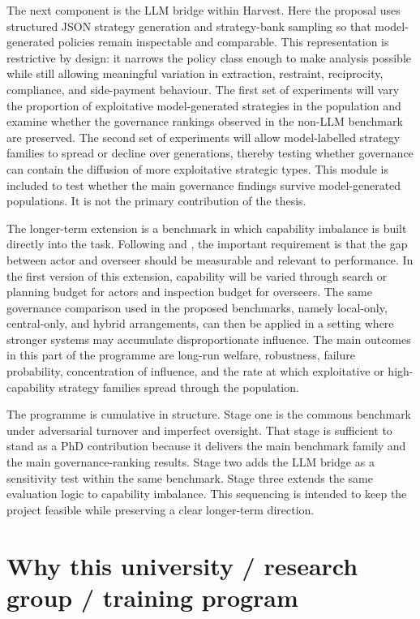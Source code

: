 \documentclass[10pt]{article}
\begin{document}
The next component is the LLM bridge within Harvest. Here the proposal uses structured JSON strategy generation and strategy-bank sampling so that model-generated policies remain inspectable and comparable. This representation is restrictive by design: it narrows the policy class enough to make analysis possible while still allowing meaningful variation in extraction, restraint, reciprocity, compliance, and side-payment behaviour. The first set of experiments will vary the proportion of exploitative model-generated strategies in the population and examine whether the governance rankings observed in the non-LLM benchmark are preserved. The second set of experiments will allow model-labelled strategy families to spread or decline over generations, thereby testing whether governance can contain the diffusion of more exploitative strategic types. This module is included to test whether the main governance findings survive model-generated populations. It is not the primary contribution of the thesis.

The longer-term extension is a benchmark in which capability imbalance is built directly into the task. Following \citet{bowman2022} and \citet{engels2025}, the important requirement is that the gap between actor and overseer should be measurable and relevant to performance. In the first version of this extension, capability will be varied through search or planning budget for actors and inspection budget for overseers. The same governance comparison used in the proposed benchmarks, namely local-only, central-only, and hybrid arrangements, can then be applied in a setting where stronger systems may accumulate disproportionate influence. The main outcomes in this part of the programme are long-run welfare, robustness, failure probability, concentration of influence, and the rate at which exploitative or high-capability strategy families spread through the population.

The programme is cumulative in structure. Stage one is the commons benchmark under adversarial turnover and imperfect oversight. That stage is sufficient to stand as a PhD contribution because it delivers the main benchmark family and the main governance-ranking results. Stage two adds the LLM bridge as a sensitivity test within the same benchmark. Stage three extends the same evaluation logic to capability imbalance. This sequencing is intended to keep the project feasible while preserving a clear longer-term direction.

\section{Why this university / research group / training program}
\end{document}
